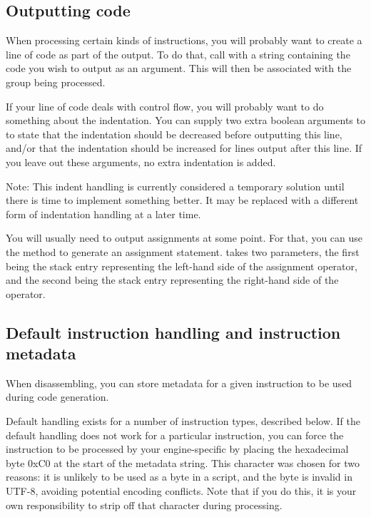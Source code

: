 \subsection{Outputting code}
When processing certain kinds of instructions, you will probably want to create a line of code as part of the output. To do that, call  with a string containing the code you wish to output as an argument. This will then be associated with the group being processed.

If your line of code deals with control flow, you will probably want to do something about the indentation. You can supply two extra boolean arguments to  to state that the indentation should be decreased before outputting this line, and/or that the indentation should be increased for lines output after this line. If you leave out these arguments, no extra indentation is added.

Note: This indent handling is currently considered a temporary solution until there is time to implement something better. It may be replaced with a different form of indentation handling at a later time.

You will usually need to output assignments at some point. For that, you can use the  method to generate an assignment statement.  takes two parameters, the first being the stack entry representing the left-hand side of the assignment operator, and the second being the stack entry representing the right-hand side of the operator.

\subsection{Default instruction handling and instruction metadata}
When disassembling, you can store metadata for a given instruction to be used during code generation.

Default handling exists for a number of instruction types, described below. If the default handling does not work for a particular instruction, you can force the instruction to be processed by your engine-specific  by placing the hexadecimal byte 0xC0 at the start of the metadata string. This character was chosen for two reasons: it is unlikely to be used as a byte in a script, and the byte is invalid in UTF-8, avoiding potential encoding conflicts. Note that if you do this, it is your own responsibility to strip off that character during processing.

